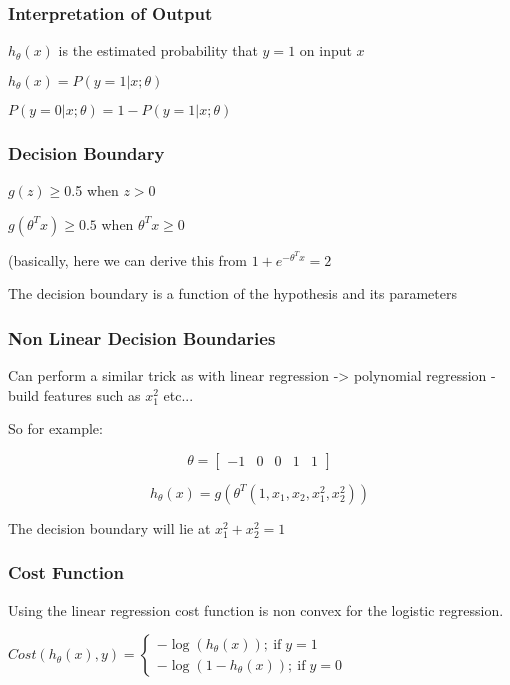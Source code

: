 \subsubsection{Interpretation of Output}

$h_\theta(x)$ is the estimated probability that  $y=1$ on input $x$ 

$h_\theta(x) = P(y=1|x;\theta)$ 

$P(y=0|x;\theta) = 1-P(y=1|x;\theta)$

\subsubsection{Decision Boundary}

$g(z) \ge 0$.5 when $z>0$ 

$g(\theta^T x ) \ge 0.5$ when $\theta^Tx \ge 0$

(basically, here we  can derive this from $1+e^{-\theta^T x}  = 2$

The decision boundary is a function of the hypothesis and its parameters

\subsubsection{Non Linear Decision Boundaries}

Can perform a similar trick as with linear regression -> polynomial regression - build features such as $x_1^2$ etc...

So for example: 

$$\theta = \left[ \begin{matrix} -1 & 0 & 0  & 1 & 1 \end{matrix} \right]$$

$$h_\theta(x) = g(\theta^T(1,x_1,x_2,x_1^2,x_2^2 )) $$

The decision boundary will lie at $x_1^2 + x_2^2 = 1$

\subsubsection{Cost Function}

Using the linear regression cost function is non convex for the logistic regression.

$Cost(h_\theta(x),y) = \begin{cases} -\log(h_\theta(x))  ;\ \text{if} \;  y=1 \\ -\log(1-h_\theta(x))   ;\ \text{if} \;  y=0  \end{cases}$

